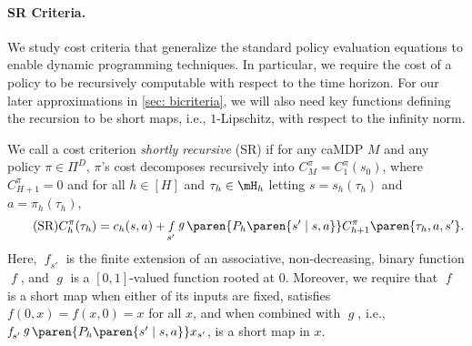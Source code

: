 \documentclass[pdftex, a4paper, 12pt]{article}
\newcommand{\jeremy}[1]{\textcolor{red}{#1}}
\DeclareMathOperator*{\f}{\mathit{f}}
\DeclareMathOperator*{\g}{\mathit{g}}
\begin{document}
\paragraph{SR Criteria.} We study cost criteria that generalize the standard policy evaluation equations to enable dynamic programming techniques. In particular, we require the cost of a policy to be recursively computable with respect to the time horizon. For our later approximations in \cref{sec: bicriteria}, we will also need key functions defining the recursion to be short maps, i.e., $1$-Lipschitz, with respect to the infinity norm.


\begin{definition}[SR]\label{def: sr}
    We call a cost criterion \emph{shortly recursive} (SR) if for any caMDP $M$ and any policy $\pi \in \Pi^D$, $\pi$'s cost decomposes recursively into $C^{\pi}_M = C_1^{\pi}(s_0)$, where $C_{H+1}^{\pi} = 0$ and for all $h \in [H]$ and $\tau_h \in \mH_h$ letting $s = s_h(\tau_h)$ and $a = \pi_h(\tau_h)$, 
    \begin{equation}\label{equ: sr}\tag{SR}
        C_h^{\pi}(\tau_h) = c_h(s,a) + \f_{s'}\g\paren{P_h\paren{s' \mid s,a}} C^{\pi}_{h+1}\paren{\tau_h, a, s'}.
    \end{equation}
    Here, $\f_{s'}$ is the finite extension of an associative, non-decreasing, binary function $\f$, and $\g$ is a $[0,1]$-valued function rooted at $0$. Moreover, we require that $\f$ is a short map when either of its inputs are fixed, satisfies $f(0,x) = f(x,0) = x$ for all $x$, and when combined with $\g$, i.e., $\f_{s'}\g\paren{P_h\paren{s' \mid s,a}}x_{s'}$, is a short map in $x$. 
\end{definition}
\end{document}
